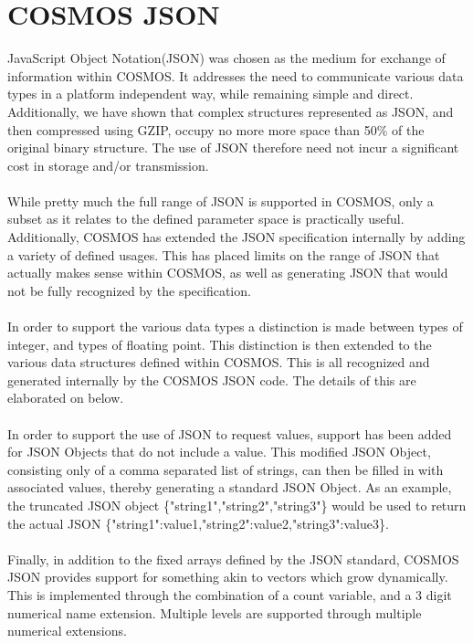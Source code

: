 \documentclass[10pt,letterpaper]{report}
\begin{document}
\chapter{COSMOS JSON}
JavaScript Object Notation(JSON) was chosen as the medium for exchange of information within COSMOS. It addresses the need to communicate various data types in a platform independent way, while remaining simple and direct. Additionally, we have shown that complex structures represented as JSON, and then compressed using GZIP, occupy no more more space than 50\% of the original binary structure. The use of JSON therefore need not incur a significant cost in storage and/or transmission.
\\
\\
While pretty much the full range of JSON is supported in COSMOS, only a subset as it relates to the defined parameter space is practically useful. Additionally, COSMOS has extended the JSON specification internally by adding a variety of defined usages. This has placed limits on the range of JSON that actually makes sense within COSMOS, as well as generating JSON that would not be fully recognized by the specification.
\\
\\
In order to support the various data types a distinction is made between types of integer, and types of floating point. This distinction is then extended to the various data structures defined within COSMOS. This is all recognized and generated internally by the COSMOS JSON code. The details of this are elaborated on below.
\\
\\
In order to support the use of JSON to request values, support has been added for JSON Objects that do not include a value. This modified JSON Object, consisting only of a comma separated list of strings, can then be filled in with associated values, thereby generating a standard JSON Object. As an example, the truncated JSON object \{"string1","string2","string3"\} would be used to return the actual JSON \{"string1":value1,"string2":value2,"string3":value3\}.
\\
\\
Finally, in addition to the fixed arrays defined by the JSON standard, COSMOS JSON provides support for something akin to vectors which grow dynamically. This is implemented through the combination of a count variable, and a 3 digit numerical name extension. Multiple levels are supported through multiple numerical extensions. 
\end{document}
